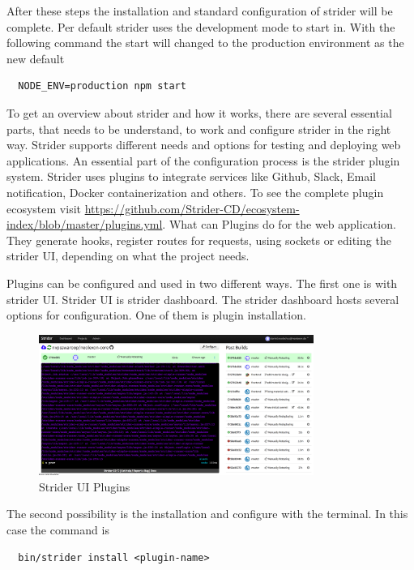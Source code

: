 After these steps the installation and standard configuration of strider will be complete. Per default strider uses the development mode to start in.
With the following command the start will changed to the production environment as the new default

\begin{lstlisting}
  NODE_ENV=production npm start
\end{lstlisting}

To get an overview about strider and how it works, there are several essential parts, that needs to be understand, to work and configure
strider in the right way. Strider supports different needs and options for testing and deploying web applications. An essential part of
the configuration process is the strider plugin system. Strider uses plugins to integrate services like Github, Slack, Email
notification, Docker containerization and others. To see the complete plugin ecosystem visit \url{https://github.com/Strider-CD/ecosystem-index/blob/master/plugins.yml}.
What can Plugins do for the web application. They generate hooks, register routes for requests, using sockets or editing the strider
UI, depending on what the project needs.

Plugins can be configured and used in two different ways. The first one is with strider UI. Strider UI is strider dashboard.
The strider dashboard hosts several options for configuration. One of them is plugin installation.

\begin{figure}[h!]
  \centering
  \includegraphics[width=0.8\textwidth]{images/striderUI.png}
  \caption{Strider UI Plugins}
\end{figure}

The second possibility is the installation and configure with the terminal. In this case the command is

\begin{lstlisting}
  bin/strider install <plugin-name>
\end{lstlisting}

